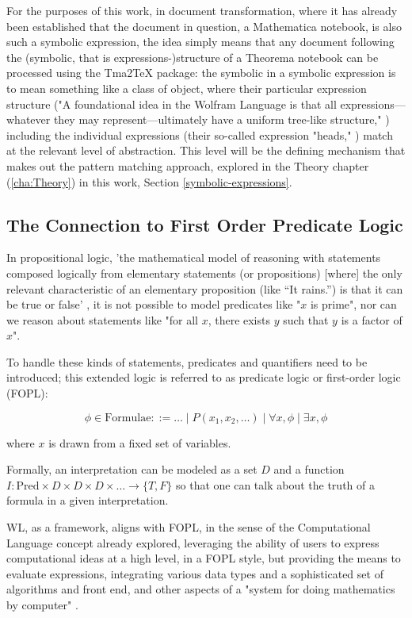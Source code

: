 For the purposes of this work, in document transformation, where it has already been established that the document in question, a Mathematica notebook, is also such a symbolic expression, the idea simply means that any document following the (symbolic, that is expressions-)structure of a Theorema notebook can be processed using the Tma2TeX package: the symbolic in a symbolic expression is to mean something like a class of object, where their particular expression structure ("A foundational idea in the Wolfram Language is that all expressions—whatever they may represent—ultimately have a uniform tree-like structure," \cite{noauthor_expression_nodate}) including the individual expressions (their so-called expression "heads," \cite{noauthor_headwolfram_nodate}) match at the relevant level of abstraction. This level will be the defining mechanism that makes out the pattern matching approach, explored in the Theory chapter (\ref{cha:Theory}) in this work, Section \ref{symbolic-expressions}.

\subsection{The Connection to First Order Predicate Logic} \label{computational-language}

In propositional logic, 'the mathematical model of reasoning with statements composed logically from elementary statements (or propositions) [where] the only relevant characteristic of an elementary proposition (like “It rains.”) is that it can be true or false' \cite{jebelean_automated_nodate-1}, it is not possible to model predicates like "\( x \) is prime", nor can we reason about statements like "for all \( x \), there exists \( y \) such that \( y \) is a factor of \( x \)". \cite{michael_george_first_2024}

To handle these kinds of statements, predicates and quantifiers need to be introduced; this extended logic is referred to as predicate logic or first-order logic (FOPL):

\[
\phi \in \text{Formulae} ::= \dots \mid P(x_1, x_2, \dots) \mid \forall x, \phi \mid \exists x, \phi
\]

where \( x \) is drawn from a fixed set of variables. \cite{michael_george_first_2024}

Formally, an interpretation can be modeled as a set \( D \) and a function \( I : \text{Pred} \times D \times D \times D \times \dots \to \{T, F\} \) so that one can talk about the truth of a formula in a given interpretation. \cite{michael_george_first_2024}

WL, as a framework, aligns with FOPL, in the sense of the Computational Language concept already explored, leveraging the ability of users to express computational ideas at a high level, in a FOPL style, but providing the means to evaluate  expressions, integrating various data types and a sophisticated set of algorithms and front end, and other aspects of a "system for doing mathematics by computer" \cite{wolfram_research_inc_mathematica_2024}.